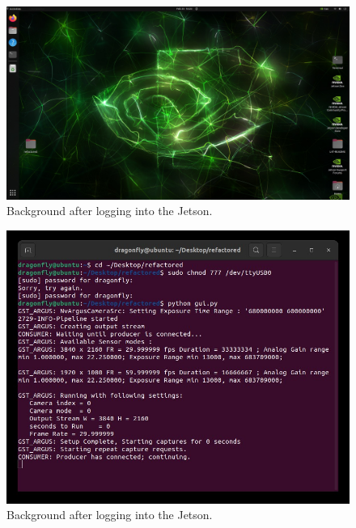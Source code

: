 \documentclass{article}
\begin{document}
\begin{outline}[enumerate]
    \begin{figure}
        \includegraphics[width=\linewidth]{../content/background.jpg}
        \caption{Background after logging into the Jetson.}
        \label{fig:background1}
    \end{figure}
    
    \begin{figure}
        \includegraphics[width=\linewidth]{../content/terminal_commands.jpg}
        \caption{Background after logging into the Jetson.}
        \label{fig:terminal1}
    \end{figure}

\end{outline}
\end{document}
